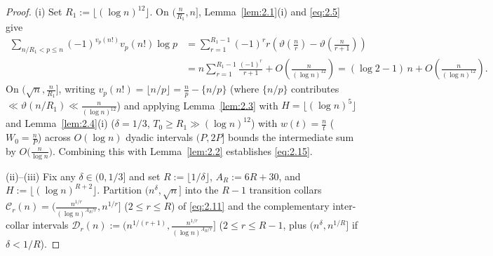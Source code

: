 \documentclass[11pt,reqno]{amsart}
\theoremstyle{remark}
\numberwithin{equation}{section}
\begin{document}
\begin{proof}
(i) Set $R_1 := \lfloor (\log n)^{12} \rfloor$. On $(\frac{n}{R_1}, n]$, Lemma~\ref{lem:2.1}(i) and \eqref{eq:2.5} give
\begin{align*}
\sum_{n/R_1 < p \le n} (-1)^{v_p(n!)} v_p(n!)\log p &= \sum_{r=1}^{R_1-1} (-1)^r r\left(\vartheta\!\left(\frac{n}{r}\right) - \vartheta\!\left(\frac{n}{r + 1}\right)\right) \\
&= n \sum_{r=1}^{R_1-1} \frac{(-1)^r}{r + 1} + O\!\left(\frac{n}{(\log n)^{12}}\right) = (\log 2 - 1)\,n + O\!\left(\frac{n}{(\log n)^{12}}\right).
\end{align*}
On $(\sqrt{n}, \frac{n}{R_1}]$, writing $v_p(n!) = \lfloor n/p \rfloor = \frac{n}{p} - \{n/p\}$ (where $\{n/p\}$ contributes $\ll \vartheta(n/R_1) \ll \frac{n}{(\log n)^{12}}$) and applying Lemma~\ref{lem:2.3} with $H = \lfloor (\log n)^5 \rfloor$ and Lemma~\ref{lem:2.4}(i) ($\delta = 1/3$, $T_0 \ge R_1 \gg (\log n)^{12}$) with $w(t) = \frac{n}{t}$ ($W_0 = \frac{n}{P}$) across $O(\log n)$ dyadic intervals $(P, 2P]$ bounds the intermediate sum by $O\bigl(\frac{n}{\log n}\bigr)$. Combining this with Lemma~\ref{lem:2.2} establishes \eqref{eq:2.15}.

(ii)--(iii) Fix any $\delta \in (0, 1/3]$ and set $R := \lfloor 1/\delta \rfloor$, $A_R := 6R + 30$, and $H := \lfloor (\log n)^{R+2} \rfloor$. Partition $(n^\delta, \sqrt{n}]$ into the $R - 1$ transition collars $\mathcal{C}_r(n) = \bigl(\frac{n^{1/r}}{(\log n)^{A_R/r}}, n^{1/r}\bigr]$ ($2 \le r \le R$) of \eqref{eq:2.11} and the complementary inter-collar intervals $\mathcal{D}_r(n) := \bigl(n^{1/(r+1)}, \frac{n^{1/r}}{(\log n)^{A_R/r}}\bigr]$ ($2 \le r \le R - 1$, plus $(n^\delta, n^{1/R}]$ if $\delta < 1/R$).


\end{proof}
\end{document}
